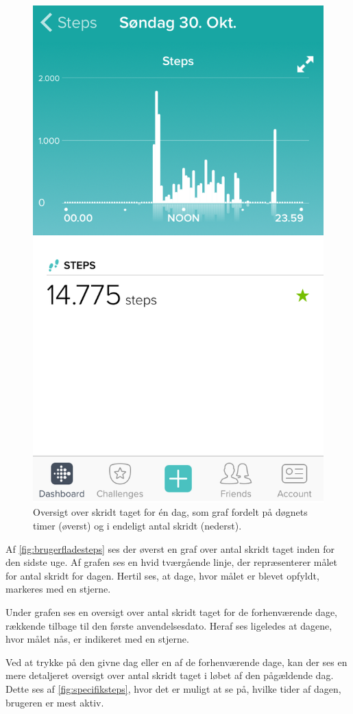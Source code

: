 \begin{figure}[H]
\begin{minipage}{0.48\textwidth}
		\includegraphics[width=0.8\linewidth]{figures/specifiksteps}
		\caption{Oversigt over skridt taget for én dag, som graf fordelt på døgnets timer (øverst) og i endeligt antal skridt (nederst).}
		 \label{fig:specifiksteps}
	\end{minipage}
\end{figure}

\noindent
Af \autoref{fig:brugerfladesteps} ses der øverst en graf over antal skridt taget inden for den sidste uge. Af grafen ses en hvid tværgående linje, der repræsenterer målet for antal skridt for dagen. Hertil ses, at dage, hvor målet er blevet opfyldt, markeres med en stjerne.

Under grafen ses en oversigt over antal skridt taget for de forhenværende dage, rækkende tilbage til den første anvendelsesdato. Heraf ses ligeledes at dagene, hvor målet nås, er indikeret med en stjerne. 

Ved at trykke på den givne dag eller en af de forhenværende dage, kan der ses en mere detaljeret oversigt over antal skridt taget i løbet af den pågældende dag. Dette ses af \autoref{fig:specifiksteps}, hvor det er muligt at se på, hvilke tider af dagen, brugeren er mest aktiv.  

